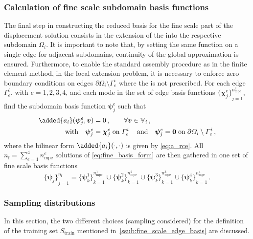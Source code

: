 \documentclass[AMA,STIX1COL,doublespace]{WileyNJD-v2}
\begin{document}
\subsubsection{Calculation of fine scale subdomain basis functions}%
\label{ssub:fine_scale_subdomain_basis}
The final step in constructing the reduced basis for the fine scale part of the displacement solution consists in the extension of the  into the respective subdomain $\varOmega_i$.
It is important to note that, by setting the same function on a single edge
for adjacent subdomains, continuity of the global approximation is ensured.
Furthermore, to enable the standard assembly procedure as in the finite element method,
in the local extension problem, it is necessary to enforce zero boundary
conditions on edges
$\partial\varOmega_{i}\setminus\varGamma_{e}^{i}$ where the  is not prescribed.
For each edge $\varGamma_{e}^{i}$, with $e=1, 2, 3, 4$, and each  mode
in the set of edge basis functions
${\{\bm{\chi}_j^e\}}_{j=1}^{n^e_{\mathrm{mpe}}}$,
find the subdomain basis function $\bm{\psi}_j^e$ such that
\begin{align}
	\label{eq:fine_basis_form}
	\begin{split}
        \added{a_i}(\bm{\psi}_j^e, \bm{v}) &= 0\,,\quad \quad\forall\bm{v}\in\mathbb{V}_i\,,\\
	\mathrm{with}\quad\bm{\psi}_j^e &= \bm{\chi}_j^e\;\mathrm{on}\;\varGamma_e^i\,\quad\mathrm{and}\quad \bm{\psi}_j^e = \bm{0}\;\mathrm{on}\;\partial\varOmega_i\setminus\varGamma_e^i\,,
	\end{split}
\end{align}
where the bilinear form $\added{a_i}(\cdot, \cdot)$ is given by \cref{eq:a_rce}.
All $n_{\mathrm{f}} = \sum_{e=1}^{4} n^e_{\mathrm{mpe}}$ solutions of \cref{eq:fine_basis_form} are then gathered in one set of fine scale basis functions 
\begin{equation}
	{\{\bm{\psi}_j\}}_{j=1}^{n_{\mathrm{f}}} = {\{\bm{\psi}_k^1\}}_{k=1}^{n^1_{\mathrm{mpe}}}\cup{\{\bm{\psi}_k^2\}}_{k=1}^{n^2_{\mathrm{mpe}}}\cup{\{\bm{\psi}_k^3\}}_{k=1}^{n^3_{\mathrm{mpe}}}\cup{\{\bm{\psi}_k^4\}}_{k=1}^{n^4_{\mathrm{mpe}}}\,.
\end{equation}

\subsubsection{Sampling distributions}%
\label{ssub:training_set}
In this section, the two different choices (sampling  considered) for the definition of the training set
$S_{\mathrm{train}}$ mentioned in~\cref{ssub:fine_scale_edge_basis} are discussed.
\end{document}
